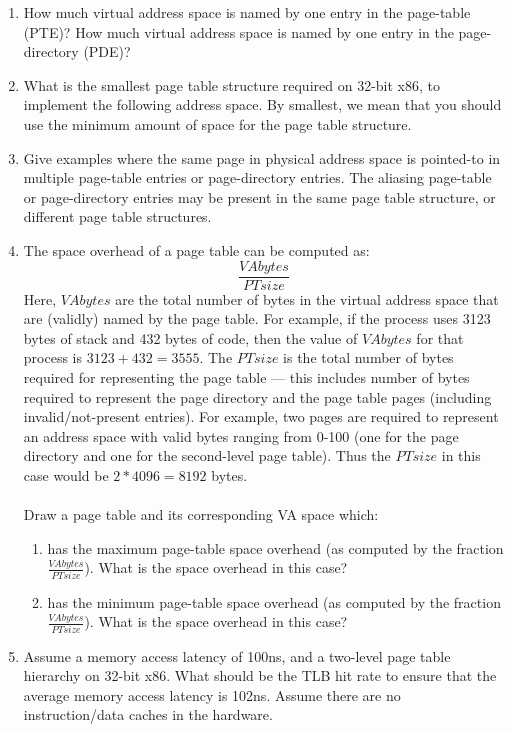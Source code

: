 \begin{enumerate}
\item How much virtual address space is named by one entry in the page-table (PTE)? How
much virtual address space is named by one entry in the page-directory (PDE)?
\item What is the smallest page table structure required on 32-bit
x86, to implement the following
address space. By smallest, we mean that you should use the minimum amount
of space for the page table structure. %
\item Give examples where the same page in physical address space is pointed-to in
multiple page-table entries or page-directory entries. The aliasing
page-table or page-directory entries may be
present in the same page table structure, or different page table structures.
\item The space overhead of a page table can be computed as:
$$
\frac{VAbytes}{PTsize}
$$
Here, $VAbytes$ are the total number of bytes in the virtual address space that
are (validly) named by the page table. For example, if the process uses 3123 bytes of
stack and 432 bytes of code, then the value of $VAbytes$ for that process
is $3123+432=3555$. The $PTsize$ is the total number of bytes required for representing
the page table --- this includes number of bytes required to represent the page directory
and the page table pages (including invalid/not-present entries). For example,
two pages are required to represent an address space with valid
bytes ranging from 0-100 (one for the page directory and one for the second-level
page table). Thus the $PTsize$ in this case would be $2 * 4096 = 8192$ bytes.\\\\
Draw a page table and its corresponding VA space which:
\begin{enumerate}
\item has the maximum page-table space overhead (as computed by the fraction $\frac{VAbytes}{PTsize}$). What is the space overhead in this case?
\item has the minimum page-table space overhead (as computed by the fraction $\frac{VAbytes}{PTsize}$). What is the space overhead in this case?
\end{enumerate}
\item Assume a memory access latency of 100ns, and a two-level page table
hierarchy on 32-bit x86. What should be the TLB hit rate to ensure
that the average memory access latency is 102ns. Assume there are no instruction/data
caches in the hardware.



\end{enumerate}
